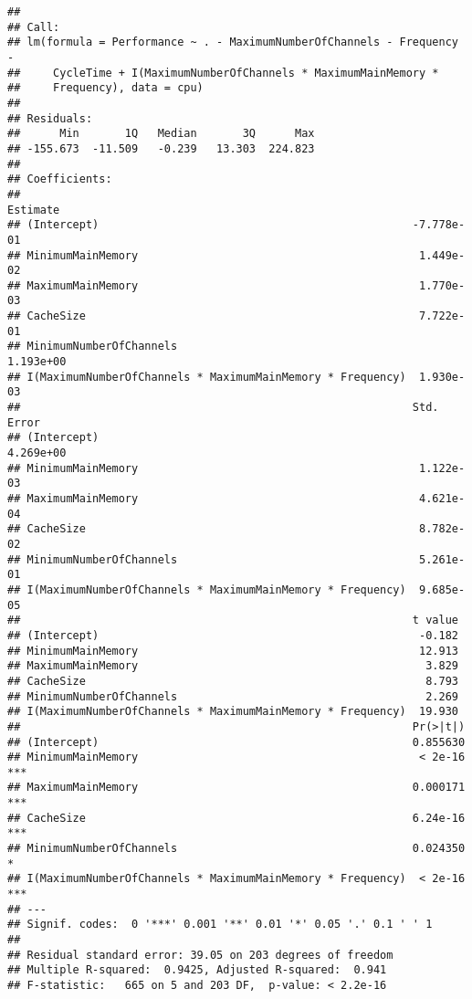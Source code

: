\documentclass[12pt]{article}
\begin{document}
\begin{verbatim}
## 
## Call:
## lm(formula = Performance ~ . - MaximumNumberOfChannels - Frequency - 
##     CycleTime + I(MaximumNumberOfChannels * MaximumMainMemory * 
##     Frequency), data = cpu)
## 
## Residuals:
##      Min       1Q   Median       3Q      Max 
## -155.673  -11.509   -0.239   13.303  224.823 
## 
## Coefficients:
##                                                              Estimate
## (Intercept)                                                -7.778e-01
## MinimumMainMemory                                           1.449e-02
## MaximumMainMemory                                           1.770e-03
## CacheSize                                                   7.722e-01
## MinimumNumberOfChannels                                     1.193e+00
## I(MaximumNumberOfChannels * MaximumMainMemory * Frequency)  1.930e-03
##                                                            Std. Error
## (Intercept)                                                 4.269e+00
## MinimumMainMemory                                           1.122e-03
## MaximumMainMemory                                           4.621e-04
## CacheSize                                                   8.782e-02
## MinimumNumberOfChannels                                     5.261e-01
## I(MaximumNumberOfChannels * MaximumMainMemory * Frequency)  9.685e-05
##                                                            t value
## (Intercept)                                                 -0.182
## MinimumMainMemory                                           12.913
## MaximumMainMemory                                            3.829
## CacheSize                                                    8.793
## MinimumNumberOfChannels                                      2.269
## I(MaximumNumberOfChannels * MaximumMainMemory * Frequency)  19.930
##                                                            Pr(>|t|)    
## (Intercept)                                                0.855630    
## MinimumMainMemory                                           < 2e-16 ***
## MaximumMainMemory                                          0.000171 ***
## CacheSize                                                  6.24e-16 ***
## MinimumNumberOfChannels                                    0.024350 *  
## I(MaximumNumberOfChannels * MaximumMainMemory * Frequency)  < 2e-16 ***
## ---
## Signif. codes:  0 '***' 0.001 '**' 0.01 '*' 0.05 '.' 0.1 ' ' 1
## 
## Residual standard error: 39.05 on 203 degrees of freedom
## Multiple R-squared:  0.9425, Adjusted R-squared:  0.941 
## F-statistic:   665 on 5 and 203 DF,  p-value: < 2.2e-16
\end{verbatim}
\end{document}
